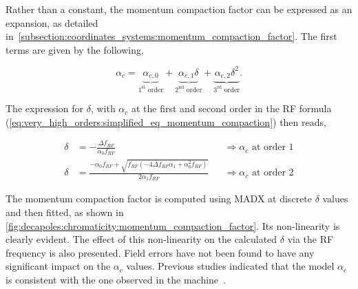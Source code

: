 \FloatBarrier
\subsubsection{}
\label{subsubsection:momentum_compaction_factor_studies}

Rather than a constant, the momentum compaction factor can be expressed as an
expansion, as detailed in~\cref{subsection:coordinates_systems:momentum_compaction_factor}.
The first terms are given by the following,

\begin{equation}
    \alpha_c = 
    \underbrace{\alpha_{c,0}}_{1^\text{st} \text{ order}}
    + \underbrace{\alpha_{c,1} \delta}_{2^\text{nd} \text{ order}}
    + \underbrace{\alpha_{c,2} \delta^2}_{3^\text{rd} \text{ order}}.
\end{equation}

The expression for $\delta$, with $\alpha_c$ at the first and second order in the RF formula
(\cref{eq:very_high_orders:simplified_eq_momentum_compaction}) then reads,

\begin{equation}
    \begin{aligned}
        \delta &= -\frac{\Delta f_{RF}}{\alpha_{0} f_{RF}} && \Rightarrow \alpha_c \text{ at order 1} \\
        \delta &= \frac{- \alpha_{0} f_{RF} + \sqrt{f_{RF} 
            \left(- 4 \Delta f_{RF} \alpha_{1} + \alpha_{0}^{2} f_{RF}\right)}}{2 \alpha_{1} f_{RF}}
            && \Rightarrow \alpha_c \text{ at order 2} 
    \end{aligned}
\end{equation}

The momentum compaction factor is computed using MADX at discrete $\delta$ values and then fitted,
as shown in \cref{fig:decapoles:chromaticity:momentum_compaction_factor}. Its non-linearity is
clearly evident. The effect of this non-linearity on the calculated $\delta$ via the RF frequency is
also presented. Field errors have not been found to have any significant impact on the $\alpha_c$
values. Previous studies indicated that the model $\alpha_c$ is consistent with the one observed in
the machine~\cite{keintzel_momentum_2021}.

